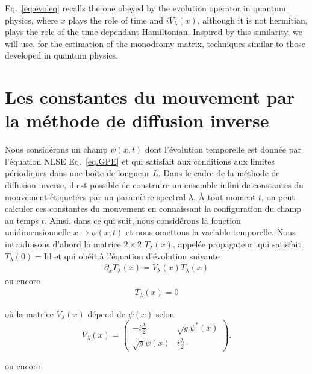 \documentclass[submission,Phys,10pt]{SciPost}%
\begin{document}
Eq.~\eqref{eq:evoleq} recalls the one  obeyed by the evolution operator in quantum physics, where $x$ plays the role of time and $iV_\lambda(x)$, although it is not hermitian, plays the role of the time-dependant Hamiltonian. Inspired by this similarity,  we will use, for the estimation of the monodromy matrix,  techniques similar to those developed in quantum physics. 

{\color{blue}
\section*{Les constantes du mouvement par la méthode de diffusion inverse}
\label{sec:ISM}
Nous considérons un champ $\psi(x,t)$ dont l'évolution temporelle est donnée par l'équation NLSE Eq.~\eqref{eq.GPE} et qui satisfait aux conditions aux limites périodiques dans une boîte de longueur $L$. 
Dans le cadre de la méthode de diffusion inverse, il est possible de construire un ensemble infini de constantes du mouvement étiquetées par un paramètre spectral $\lambda$. 
À tout moment $t$, on peut calculer ces constantes du mouvement en connaissant la configuration du champ au temps $t$. Ainsi, dans ce qui suit, nous considérons la fonction unidimensionnelle $x\rightarrow \psi(x,t)$ et nous omettons la variable temporelle.
Nous introduisons d'abord la matrice $2\times 2$ $T_{\lambda}(x)$, appelée propagateur, qui satisfait $T_{\lambda}(0)=\mathrm{Id}$ et qui obéit à l'équation d'évolution suivante
\begin{eqnarray}
    \partial_{x}T_{\lambda}(x)=V_{\lambda}(x)T_{\lambda}(x)
    \label{eq:evoleq}
    \end{eqnarray}
{\color{magenta} 
ou encore  
\begin{eqnarray}
    [\partial_{x} - V_{\lambda}(x) ] T_{\lambda}(x)= 0
\end{eqnarray}
} 
  
où la matrice $V_{\lambda}(x)$ dépend de $\psi(x)$ selon
\begin{equation}
    V_{\lambda}(x)=
    \begin{pmatrix} 
    -i\frac{\lambda}{2} & \sqrt{g}\psi^*(x)\\
     \sqrt{g}\psi(x)& i\frac{\lambda}{2}
    \end{pmatrix}.
    \label{eq:U}
\end{equation}

{\color{magenta} 
ou encore 

}}
\end{document}
